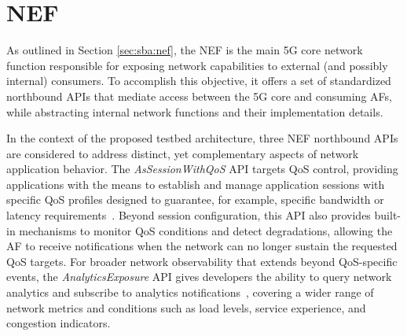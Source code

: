 \section{\acs{NEF}}
\label{chap:proposal:nef}

As outlined in Section \ref{sec:sba:nef}, the \acf{NEF} is the main \acs{5G} core network function responsible for exposing network capabilities to external (and possibly internal) consumers. To accomplish this objective, it offers a set of standardized northbound \acsp{API} that mediate access between the \acs{5G} core and consuming \acsp{AF}, while abstracting internal network functions and their implementation details.

In the context of the proposed testbed architecture, three \acs{NEF} northbound \acsp{API} are considered to address distinct, yet complementary aspects of network application behavior. The \textit{AsSessionWithQoS} \acs{API} targets \acs{QoS} control, providing applications with the means to establish and manage application sessions with specific \acs{QoS} profiles designed to guarantee, for example, specific bandwidth or latency requirements~\cite{ETSI_TS_129_122_V18_8_0}. Beyond session configuration, this \acs{API} also provides built-in mechanisms to monitor \acs{QoS} conditions and detect degradations, allowing the \acs{AF} to receive notifications when the network can no longer sustain the requested \acs{QoS} targets. For broader network observability that extends beyond \acs{QoS}-specific events, the \textit{AnalyticsExposure} \acs{API} gives developers the ability to query network analytics and subscribe to analytics notifications~\cite{ETSI_TS_129_522_V18_11_0}, covering a wider range of network metrics and conditions such as load levels, service experience, and congestion indicators.


